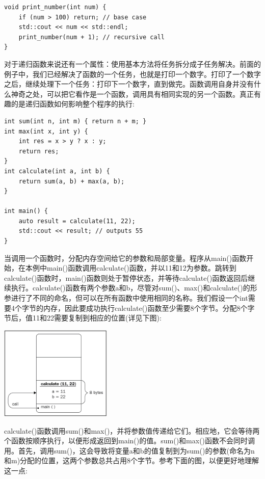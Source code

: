 \begin{lstlisting}[caption={}]
void print_number(int num) {
	if (num > 100) return; // base case
	std::cout << num << std::endl;
	print_number(num + 1); // recursive call
}
\end{lstlisting}

对于递归函数来说还有一个属性：使用基本方法将任务拆分成子任务解决。前面的例子中，我们已经解决了函数的一个任务，也就是打印一个数字。打印了一个数字之后，继续处理下一个任务：打印下一个数字，直到做完。函数调用自身并没有什么神奇之处，可以把它看作是一个函数，调用具有相同实现的另一个函数。真正有趣的是递归函数如何影响整个程序的执行:  \par

\begin{lstlisting}[caption={}]
int sum(int n, int m) { return n + m; }
int max(int x, int y) {
	int res = x > y ? x : y;
	return res;
}
int calculate(int a, int b) {
	return sum(a, b) + max(a, b);
}

int main() {
	auto result = calculate(11, 22);
	std::cout << result; // outputs 55
}
\end{lstlisting}

当调用一个函数时，分配内存空间给它的参数和局部变量。程序从main()函数开始，在本例中main()函数调用calculate()函数，并以11和12为参数。跳转到calculate()函数时，main()函数则处于暂停状态，并等待calculate()函数返回后继续执行。calculate()函数有两个参数a和b，尽管对sum()、max()和calculate()的形参进行了不同的命名，但可以在所有函数中使用相同的名称。我们假设一个int需要4个字节的内存，因此要成功执行calculate()函数至少需要8个字节。分配8个字节后，值11和22需要复制到相应的位置(详见下图):

\begin{center}
	\includegraphics[width=0.4\textwidth]{content/Section-1/Chapter-2/1}
\end{center}

calculate()函数调用sum()和max()，并将参数值传递给它们。相应地，它会等待两个函数按顺序执行，以便形成返回到main()的值。sum()和max()函数不会同时调用。首先，调用sum()，这会导致将变量a和b的值复制到为sum()的参数(命名为n和m)分配的位置，这两个参数总共占用8个字节。参考下面的图，以便更好地理解这一点: \par

